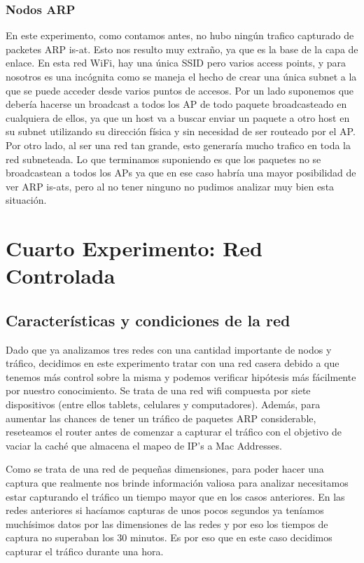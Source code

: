 \documentclass{article}
\theoremstyle{definition}
\theoremstyle{remark}
\begin{document}
\subsubsection{Nodos ARP}
En este experimento, como contamos antes, no hubo ningún trafico capturado de packetes ARP is-at. Esto nos resulto muy extraño, ya que es la base de la capa de enlace. En esta red WiFi, hay una única SSID pero varios access points, y para nosotros es una incógnita como se maneja el hecho de crear una única subnet a la que se puede acceder desde varios puntos de accesos. Por un lado suponemos que debería hacerse un broadcast a todos los AP de todo paquete broadcasteado en cualquiera de ellos, ya que un host va a buscar enviar un paquete a otro host en su subnet utilizando su dirección física y sin necesidad de ser routeado por el AP. Por otro lado, al ser una red tan grande, esto generaría mucho trafico en toda la red subneteada. Lo que terminamos suponiendo es que los paquetes no se broadcastean a todos los APs ya que en ese caso habría una mayor posibilidad de ver ARP is-ats, pero al no tener ninguno no pudimos analizar muy bien esta situación.

\newpage
\section{Cuarto Experimento: Red Controlada}
\subsection{Características y condiciones de la red}
Dado que ya analizamos tres redes con una cantidad importante de nodos y tráfico, decidimos en este experimento tratar con una red casera debido a que tenemos más control sobre la misma y podemos verificar hipótesis más fácilmente por nuestro conocimiento. Se trata de una red wifi compuesta por siete dispositivos (entre ellos tablets, celulares y computadores). Además, para aumentar las chances de tener un tráfico de paquetes ARP considerable, reseteamos el router antes de comenzar a capturar el tráfico con el objetivo de vaciar la caché que almacena el mapeo de IP's a Mac Addresses.
\par Como se trata de una red de pequeñas dimensiones, para poder hacer una captura que realmente nos brinde información valiosa para analizar necesitamos estar capturando el tráfico un tiempo mayor que en los casos anteriores. En las redes anteriores si hacíamos capturas de unos pocos segundos ya teníamos muchísimos datos por las dimensiones de las redes y por eso los tiempos de captura no superaban los 30 minutos. Es por eso que en este caso decidimos capturar el tráfico durante una hora.
\end{document}

